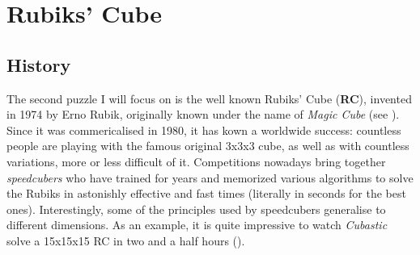 \section{Rubiks' Cube}



\subsection{History}
The second puzzle I will focus on is the well known Rubiks' Cube (\textbf{RC}), invented in 1974 by Erno Rubik, originally known under the name of \textit{Magic Cube} (see \cite{RubiksWiki}). Since it was commericalised in 1980, it has kown a worldwide success: countless people are playing with the famous original 3x3x3 cube, as well as with countless variations, more or less difficult of it. Competitions nowadays bring together \textit{speedcubers} who have trained for years and memorized various algorithms to solve the Rubiks in astonishly effective and fast times (literally in seconds for the best ones). Interestingly, some of the principles used by speedcubers generalise to different dimensions. As an example, it is quite impressive to watch \textit{Cubastic} solve a 15x15x15 RC in two and a half hours (\cite{151515Rubiks}).

